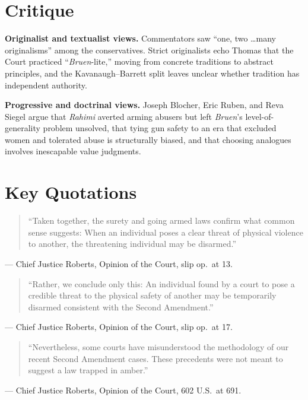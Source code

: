 \documentclass[12pt]{article}
\begin{document}
\section{Critique}

\textbf{Originalist and textualist views.} Commentators saw ``one, two \dots many originalisms'' among the conservatives. Strict originalists echo Thomas that the Court practiced ``\textit{Bruen}-lite,'' moving from concrete traditions to abstract principles, and the Kavanaugh--Barrett split leaves unclear whether tradition has independent authority.

\textbf{Progressive and doctrinal views.} Joseph Blocher, Eric Ruben, and Reva Siegel argue that \textit{Rahimi} averted arming abusers but left \textit{Bruen}'s level-of-generality problem unsolved, that tying gun safety to an era that excluded women and tolerated abuse is structurally biased, and that choosing analogues involves inescapable value judgments.

\section{Key Quotations}

\begin{quote}
``Taken together, the surety and going armed laws confirm what common sense suggests: When an individual poses a clear threat of physical violence to another, the threatening individual may be disarmed.''
\end{quote}
\noindent --- Chief Justice Roberts, Opinion of the Court, slip op.\ at 13.

\begin{quote}
``Rather, we conclude only this: An individual found by a court to pose a credible threat to the physical safety of another may be temporarily disarmed consistent with the Second Amendment.''
\end{quote}
\noindent --- Chief Justice Roberts, Opinion of the Court, slip op.\ at 17.

\begin{quote}
``Nevertheless, some courts have misunderstood the methodology of our recent Second Amendment cases. These precedents were not meant to suggest a law trapped in amber.''
\end{quote}
\noindent --- Chief Justice Roberts, Opinion of the Court, 602 U.S.\ at 691.
\end{document}
